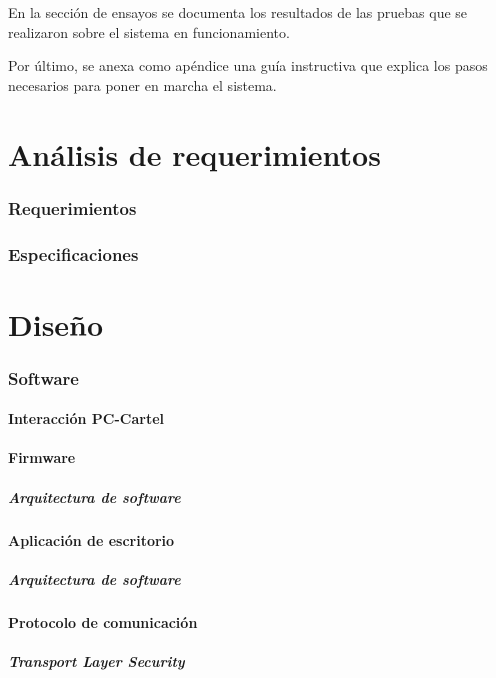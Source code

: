 En la sección de ensayos se documenta los resultados de las pruebas que se realizaron sobre el sistema en funcionamiento.

Por último, se anexa como apéndice una guía instructiva que explica los pasos necesarios para poner en marcha el sistema.

\part{Análisis de requerimientos}\label{part:analisis}
\section{Requerimientos}
\section{Especificaciones}
\clearpage

\part{Diseño}\label{part:diseno}
\section{Software}
\subsection{Interacción PC-Cartel}
\subsection{Firmware}
\subsubsection{Arquitectura de software}
\subsection{Aplicación de escritorio}
\subsubsection{Arquitectura de software}
\subsection{Protocolo de comunicación}
\subsubsection{Transport Layer Security}

